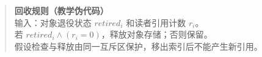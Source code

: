 \begin{quote}
\textbf{回收规则（教学伪代码）}\\
输入：对象退役状态 $retired_i$ 和读者引用计数 $r_i$。\\
若 $retired_i \land (r_i=0)$，释放对象存储；否则保留。\\
假设检查与释放由同一互斥区保护，移出索引后不能产生新引用。
\end{quote}
